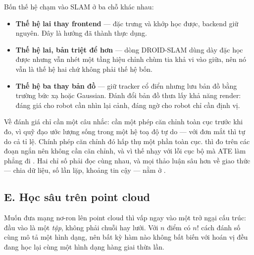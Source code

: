 \documentclass[../../../deep_learning.tex]{subfiles}
\begin{document}
Bốn thế hệ chạm vào SLAM ở ba chỗ khác nhau:
\begin{itemize}
\item \textbf{Thế hệ lai thay frontend} --- đặc trưng và khớp học được, backend giữ nguyên. Đây là hướng đã thành thực dụng.
\item \textbf{Thế hệ lai, bản triệt để hơn} --- dòng DROID-SLAM dùng  dày đặc học được nhưng vẫn nhét một tầng hiệu chỉnh chùm tia khả vi vào giữa, nên nó vẫn là thế hệ hai chứ không phải thế hệ bốn.
\item \textbf{Thế hệ ba thay bản đồ} --- giữ tracker cổ điển nhưng lưu bản đồ bằng trường bức xạ hoặc Gaussian. Đánh đổi bản đồ thưa lấy khả năng render: đáng giá cho robot cần nhìn lại cảnh, đáng ngờ cho robot chỉ cần định vị.
\end{itemize}

Về đánh giá chỉ cần một câu nhắc:  cần một phép căn chỉnh toàn cục trước khi đo, vì quỹ đạo ước lượng sống trong một hệ toạ độ tự do --- với đơn mắt thì tự do cả tỉ lệ. Chính phép căn chỉnh đó hấp thụ một phần  toàn cục.  thì đo trên các đoạn ngắn nên không cần căn chỉnh, và vì thế nhạy với lỗi cục bộ mà ATE làm phẳng đi \cite{sturm2012benchmark}. Hai chỉ số phải đọc cùng nhau, và mọi thảo luận sâu hơn về giao thức --- chia dữ liệu, số lần lặp, khoảng tin cậy --- nằm ở .

\subsection{E. Học sâu trên point cloud}
Muốn đưa mạng nơ-ron lên point cloud thì vấp ngay vào một trở ngại cấu trúc: đầu vào là một \emph{tập}, không phải chuỗi hay lưới. Với \(n\) điểm có \(n!\) cách đánh số cùng mô tả một hình dạng, nên bất kỳ hàm nào không bất biến với hoán vị đều đang học lại cùng một hình dạng hàng giai thừa lần.
\end{document}
